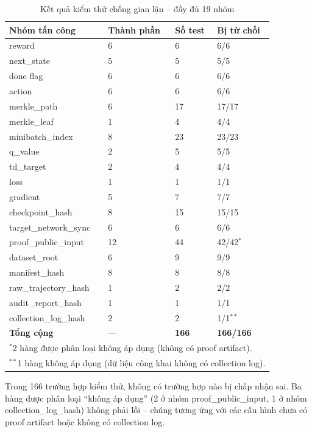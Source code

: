 \documentclass[12pt,a4paper,oneside]{report}
\begin{document}
\begin{table}[H]
\centering
\caption{Kết quả kiểm thử chống gian lận -- đầy đủ 19 nhóm}
\small
\begin{tabularx}{\textwidth}{@{}p{} p{} p{} p{}@{}}
\toprule
Nhóm tấn công & Thành phần & Số test & Bị từ chối \\
\midrule
reward & 6 & 6 & 6/6 \\
next\_state & 5 & 5 & 5/5 \\
done flag & 6 & 6 & 6/6 \\
action & 6 & 6 & 6/6 \\
merkle\_path & 6 & 17 & 17/17 \\
merkle\_leaf & 1 & 4 & 4/4 \\
minibatch\_index & 8 & 23 & 23/23 \\
q\_value & 2 & 5 & 5/5 \\
td\_target & 2 & 4 & 4/4 \\
loss & 1 & 1 & 1/1 \\
gradient & 5 & 7 & 7/7 \\
checkpoint\_hash & 8 & 15 & 15/15 \\
target\_network\_sync & 6 & 6 & 6/6 \\
proof\_public\_input & 12 & 44 & 42/42$^*$ \\
dataset\_root & 6 & 9 & 9/9 \\
manifest\_hash & 8 & 8 & 8/8 \\
raw\_trajectory\_hash & 1 & 2 & 2/2 \\
audit\_report\_hash & 1 & 1 & 1/1 \\
collection\_log\_hash & 2 & 2 & 1/1$^{**}$ \\
\midrule
\textbf{Tổng cộng} & --- & \textbf{166} & \textbf{166/166} \\
\bottomrule
\multicolumn{4}{l}{\scriptsize $^*$2 hàng được phân loại không áp dụng (không có proof artifact).} \\
\multicolumn{4}{l}{\scriptsize $^{**}$1 hàng không áp dụng (dữ liệu công khai không có collection log).}
\end{tabularx}
\end{table}

\begin{notebox}
Trong 166 trường hợp kiểm thử, không có trường hợp nào bị chấp nhận sai. Ba hàng được phân loại ``không áp dụng'' (2 ở nhóm proof\_public\_input, 1 ở nhóm collection\_log\_hash) không phải lỗi -- chúng tương ứng với các cấu hình chưa có proof artifact hoặc không có collection log.
\end{notebox}
\end{document}
